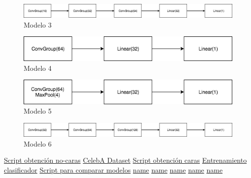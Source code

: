 \documentclass[a4paper, 11pt]{article}
\begin{document}
	
	\begin{figure}[htb!]
		\begin{minipage}{1\textwidth}
			\centering
			\includegraphics[scale=.5]{pics/model3}
			\caption{Modelo 3}
		\end{minipage}\hfill
	\end{figure}
	
	
	\begin{figure}[htb!]
		\begin{minipage}{1\textwidth}
			\centering
			\includegraphics[scale=.5]{pics/model4}
			\caption{Modelo 4}
		\end{minipage}\hfill
	\end{figure}		
	
	
	\begin{figure}[htb!]
		\begin{minipage}{1\textwidth}
			\centering
			\includegraphics[scale=.5]{pics/model5}
			\caption{Modelo 5}
		\end{minipage}\hfill
	\end{figure}
	
	
	\begin{figure}[htb!]
		\begin{minipage}{1\textwidth}
			\centering
			\includegraphics[scale=.5]{pics/model6}
			\caption{Modelo 6}
		\end{minipage}\hfill
	\end{figure}	
		
\begin{thebibliography}{50}
	
	\href{https://github.com/pancho111203/pytorch-face-detection/blob/master/scripts/get_nofaces.py}{Script obtención no-caras}
	\href{http://mmlab.ie.cuhk.edu.hk/projects/CelebA.html}{CelebA Dataset}
	\href{https://github.com/pancho111203/pytorch-face-detection/blob/master/scripts/crop_faces.py}{Script obtención caras}
	\href{https://github.com/pancho111203/pytorch-face-detection/blob/master/face_classifier_training.py}{Entrenamiento clasificador}
	\href{https://github.com/pancho111203/pytorch-face-detection/blob/master/compare-models.py}{Script para comparar modelos}
	\href{url }{name}
	\href{url }{name}
	\href{url }{name}
	\href{url }{name}
	\href{url }{name}
\end{thebibliography}
\end{document}
